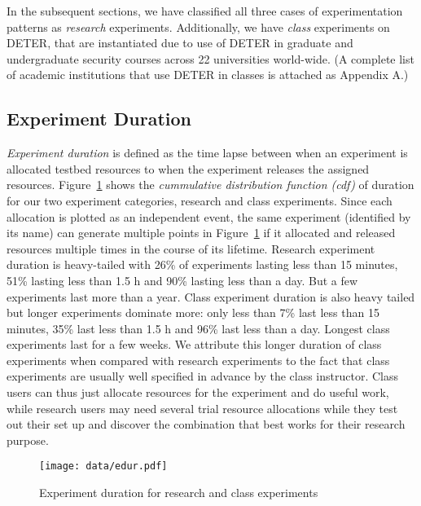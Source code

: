 \documentclass[12pt]{article}
\begin{document}
In the subsequent sections, we have classified 
 all three cases of experimentation patterns as 
{\it research} experiments. 
Additionally, we have {\it class} experiments
 on DETER, that are instantiated due to use of DETER in graduate and undergraduate
 security courses across 22 universities world-wide. 
(A complete list of academic institutions that use DETER in classes is attached as 
Appendix A.)

 
\subsection*{Experiment Duration}
 {\it Experiment duration} is defined 
 as the time lapse between
  when an experiment is allocated 
   testbed resources 
 to when the experiment releases
  the assigned resources.
Figure~\ref{expdur} shows the \textit{cummulative distribution function (cdf)} of
 duration for our two 
  experiment categories, research and class
   experiments. 
Since each allocation is plotted as an 
 independent event, the same experiment (identified by its name) can generate multiple
 points in Figure~\ref{expdur} if it allocated and released resources multiple times in the course
 of its lifetime.
Research experiment duration is heavy-tailed with 26\% of experiments
lasting less than 15 minutes, 51\% lasting less than 1.5 h and 90\%
lasting less than a day. But a few experiments last more than a year. 
Class experiment duration is also heavy tailed but longer experiments
dominate more: only less than 7\% last less than 15 minutes, 35\% last
less than 1.5 h and 96\% last less than a day. Longest class experiments
last for a few weeks. We attribute this longer duration of class
experiments when compared with research experiments to the fact that
class experiments are usually well specified in advance by the class
instructor. Class users can thus just allocate resources for the experiment and do
useful work, while research users may need several trial resource
allocations while they test out their set up and discover the combination
that best works for their research purpose.

\begin{figure}[htbp]
\begin{center}
\texttt{[image: data/edur.pdf]}
\caption{Experiment duration for research and class experiments}
\label{expdur}
\end{center}
\end{figure}
\end{document}
